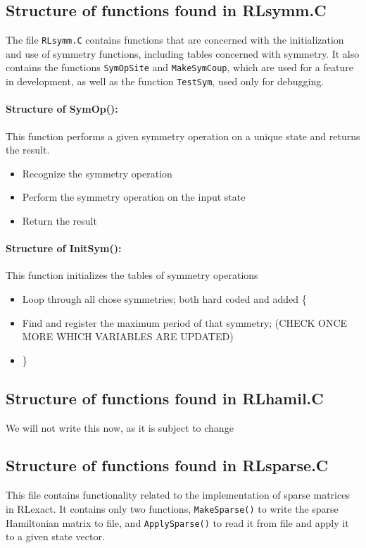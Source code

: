 \documentclass{article}
\begin{document}
\subsection{Structure of functions found in RLsymm.C}
The file \verb+RLsymm.C+ contains functions that are concerned with the initialization and use of symmetry functions, including tables  concerned with symmetry. It also contains the  functions \verb+SymOpSite+ and \verb+MakeSymCoup+, which are used for a feature in development, as well as the function \verb+TestSym+, used only for debugging.

\paragraph{Structure of SymOp():} This function performs a given symmetry operation on a unique state and returns the result.
\begin{itemize}
\item Recognize the symmetry operation
\item Perform the symmetry operation on the input state
\item Return the result
\end{itemize}

\paragraph{Structure of InitSym():} This function initializes the tables of symmetry operations
\begin{itemize}
\item Loop through all chose symmetries; both hard coded and added \{
\item \hspace{5mm} Find and register the maximum period of that symmetry; (CHECK ONCE MORE WHICH VARIABLES ARE UPDATED)
\item \}
\end{itemize}

\subsection{Structure of functions found in RLhamil.C}
We will not write this now, as it is subject to change

\subsection{Structure of functions found in RLsparse.C}
This file contains functionality related to the implementation of sparse matrices in RLexact.
It contains only two functions, \verb+MakeSparse()+ to write the sparse Hamiltonian matrix to file, and \verb+ApplySparse()+ to read it from file and apply it to a given state vector.
\end{document}
